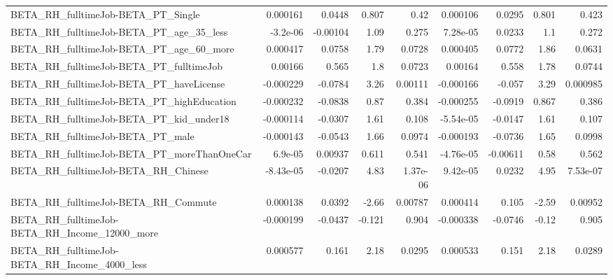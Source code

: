 \begin{tabular}{lrrrrrrrr}
BETA\_RH\_fulltimeJob-BETA\_PT\_Single                 &    0.000161 &       0.0448 &    0.807 &     0.42 &   0.000106 &      0.0295 &        0.801 &         0.423 \\
BETA\_RH\_fulltimeJob-BETA\_PT\_age\_35\_less            &    -3.2e-06 &     -0.00104 &     1.09 &    0.275 &   7.28e-05 &      0.0233 &          1.1 &         0.272 \\
BETA\_RH\_fulltimeJob-BETA\_PT\_age\_60\_more            &    0.000417 &       0.0758 &     1.79 &   0.0728 &   0.000405 &      0.0772 &         1.86 &        0.0631 \\
BETA\_RH\_fulltimeJob-BETA\_PT\_fulltimeJob            &     0.00166 &        0.565 &      1.8 &   0.0723 &    0.00164 &       0.558 &         1.78 &        0.0744 \\
BETA\_RH\_fulltimeJob-BETA\_PT\_haveLicense            &   -0.000229 &      -0.0784 &     3.26 &  0.00111 &  -0.000166 &      -0.057 &         3.29 &      0.000985 \\
BETA\_RH\_fulltimeJob-BETA\_PT\_highEducation          &   -0.000232 &      -0.0838 &     0.87 &    0.384 &  -0.000255 &     -0.0919 &        0.867 &         0.386 \\
BETA\_RH\_fulltimeJob-BETA\_PT\_kid\_under18            &   -0.000114 &      -0.0307 &     1.61 &    0.108 &  -5.54e-05 &     -0.0147 &         1.61 &         0.107 \\
BETA\_RH\_fulltimeJob-BETA\_PT\_male                   &   -0.000143 &      -0.0543 &     1.66 &   0.0974 &  -0.000193 &     -0.0736 &         1.65 &        0.0998 \\
BETA\_RH\_fulltimeJob-BETA\_PT\_moreThanOneCar         &     6.9e-05 &      0.00937 &    0.611 &    0.541 &  -4.76e-05 &    -0.00611 &         0.58 &         0.562 \\
BETA\_RH\_fulltimeJob-BETA\_RH\_Chinese                &   -8.43e-05 &      -0.0207 &     4.83 & 1.37e-06 &   9.42e-05 &      0.0232 &         4.95 &      7.53e-07 \\
BETA\_RH\_fulltimeJob-BETA\_RH\_Commute                &    0.000138 &       0.0392 &    -2.66 &  0.00787 &   0.000414 &       0.105 &        -2.59 &       0.00952 \\
BETA\_RH\_fulltimeJob-BETA\_RH\_Income\_12000\_more      &   -0.000199 &      -0.0437 &   -0.121 &    0.904 &  -0.000338 &     -0.0746 &        -0.12 &         0.905 \\
BETA\_RH\_fulltimeJob-BETA\_RH\_Income\_4000\_less       &    0.000577 &        0.161 &     2.18 &   0.0295 &   0.000533 &       0.151 &         2.18 &        0.0289 \\

\end{tabular}
